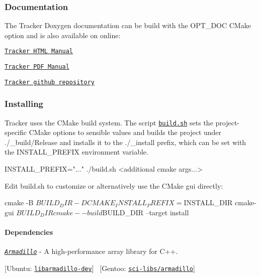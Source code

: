 \subsubsection*{Documentation}

The Tracker Doxygen documentation can be build with the {\ttfamily O\+P\+T\+\_\+\+D\+OC} C\+Make option and is also available on online\+:
\begin{DoxyItemize}
\item \href{https://markjolah.github.io/Tracker/index.html}{\tt Tracker H\+T\+ML Manual}
\item \href{https://markjolah.github.io/Tracker/pdf/Tracker-0.1-reference.pdf}{\tt Tracker P\+DF Manual}
\item \href{https://github.com/markjolah/Tracker}{\tt Tracker github repository}
\end{DoxyItemize}

\subsubsection*{Installing}

Tracker uses the C\+Make build system. The script \href{https://github.com/markjolah/Tracker/blob/master/build.sh}{\tt {\ttfamily build.\+sh}} sets the project-\/specific C\+Make options to sensible values and builds the project under {\ttfamily ./\+\_\+build/\+Release} and installs it to the {\ttfamily ./\+\_\+install} prefix, which can be set with the {\ttfamily I\+N\+S\+T\+A\+L\+L\+\_\+\+P\+R\+E\+F\+IX} environment variable. \begin{DoxyVerb}INSTALL_PREFIX="..." ./build.sh <additional cmake args...>
\end{DoxyVerb}


Edit {\ttfamily build.\+sh} to customize or alternatively use the C\+Make gui directly\+: \begin{DoxyVerb}cmake -B $BUILD_DIR -DCMAKE_INSTALL_PREFIX=$INSTALL_DIR
cmake-gui $BUILD_DIR
cmake --build $BUILD_DIR --target install
\end{DoxyVerb}


\paragraph*{Dependencies}


\begin{DoxyItemize}
\item \href{http://arma.sourceforge.net/docs.html}{\tt {\itshape Armadillo}} -\/ A high-\/performance array library for C++.
\begin{DoxyItemize}
\item \mbox{[}Ubuntu\+: \href{https://packages.ubuntu.com/search?keywords=libarmadillo-dev}{\tt {\ttfamily libarmadillo-\/dev}}\mbox{]}~ \mbox{[}Gentoo\+: \href{https://packages.gentoo.org/packages/sci-libs/armadillo}{\tt {\ttfamily sci-\/libs/armadillo}}\mbox{]}
\end{DoxyItemize}
\end{DoxyItemize}

